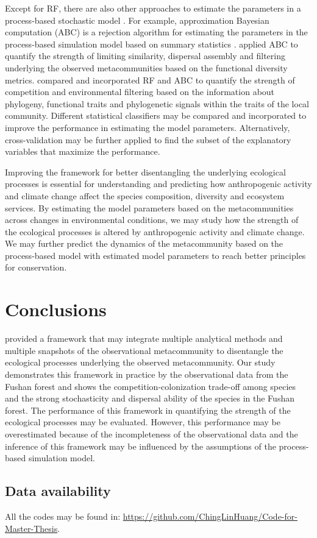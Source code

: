 Except for RF, there are also other approaches to estimate the parameters in a process-based stochastic model \citep{hartig2011statistical}. For example, approximation Bayesian computation (ABC) is a rejection algorithm for estimating the parameters in the process-based simulation model based on summary statistics \citep{csillery2010approximate}. \citet{van2015new} applied ABC to quantify the strength of limiting similarity, dispersal assembly and filtering underlying the observed metacommunities based on the functional diversity metrics. \citet{ruffley2019identifying} compared and incorporated RF and ABC to quantify the strength of competition and environmental filtering based on the information about phylogeny, functional traits and phylogenetic signals within the traits of the local community. Different statistical classifiers may be compared and incorporated to improve the performance in estimating the model parameters. Alternatively, cross-validation may be further applied to find the subset of the explanatory variables that maximize the performance.

Improving the framework for better disentangling the underlying ecological processes is essential for understanding and predicting how anthropogenic activity and climate change affect the species composition, diversity and ecosystem services. By estimating the model parameters based on the metacommunities across changes in environmental conditions, we may study how the strength of the ecological processes is altered by anthropogenic activity and climate change. We may further predict the dynamics of the metacommunity based on the process-based model with estimated model parameters to reach better principles for conservation.




\chapter*{Conclusions}
\setcounter{chapter}{6}
\noindent
\citet{guzman2022accounting} provided a framework that may integrate multiple analytical methods and multiple snapshots of the observational metacommunity to disentangle the ecological processes underlying the observed metacommunity. Our study demonstrates this framework in practice by the observational data from the Fushan forest and shows the competition-colonization trade-off among species and the strong stochasticity and dispersal ability of the species in the Fushan forest. The performance of this framework in quantifying the strength of the ecological processes may be evaluated. However, this performance may be overestimated because of the incompleteness of the observational data and the inference of this framework may be influenced by the assumptions of the process-based simulation model.


\section*{Data availability}
\noindent
All the codes may be found in: \url{https://github.com/ChingLinHuang/Code-for-Master-Thesis}.
